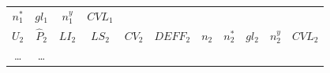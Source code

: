 \documentclass[12pt,spanish,]{book}
\begin{document}
\begin{longtable}[]{@{}ccccccccccc@{}}
\begin{minipage}[t]{0.11\columnwidth}
\(n^*_1\)\strut
\end{minipage} & \begin{minipage}[t]{0.05\columnwidth}\centering
\(gl_1\)\strut
\end{minipage} & \begin{minipage}[t]{0.04\columnwidth}\centering
\(n^y_1\)\strut
\end{minipage} & \begin{minipage}[t]{0.11\columnwidth}\centering
\(CVL_1\)\strut
\end{minipage}\tabularnewline
\begin{minipage}[t]{0.09\columnwidth}\centering
\(U_2\)\strut
\end{minipage} & \begin{minipage}[t]{0.07\columnwidth}\centering
\(\hat{P}_2\)\strut
\end{minipage} & \begin{minipage}[t]{0.04\columnwidth}\centering
\(LI_2\)\strut
\end{minipage} & \begin{minipage}[t]{0.04\columnwidth}\centering
\(LS_2\)\strut
\end{minipage} & \begin{minipage}[t]{0.07\columnwidth}\centering
\(CV_2\)\strut
\end{minipage} & \begin{minipage}[t]{0.05\columnwidth}\centering
\(DEFF_2\)\strut
\end{minipage} & \begin{minipage}[t]{0.05\columnwidth}\centering
\(n_2\)\strut
\end{minipage} & \begin{minipage}[t]{0.11\columnwidth}\centering
\(n^*_2\)\strut
\end{minipage} & \begin{minipage}[t]{0.05\columnwidth}\centering
\(gl_2\)\strut
\end{minipage} & \begin{minipage}[t]{0.04\columnwidth}\centering
\(n^y_2\)\strut
\end{minipage} & \begin{minipage}[t]{0.11\columnwidth}\centering
\(CVL_2\)\strut
\end{minipage}\tabularnewline
\begin{minipage}[t]{0.09\columnwidth}\centering
\ldots{}\strut
\end{minipage} & \begin{minipage}[t]{0.07\columnwidth}\centering
\ldots{}\strut

\end{minipage}
\end{longtable}
\end{document}
